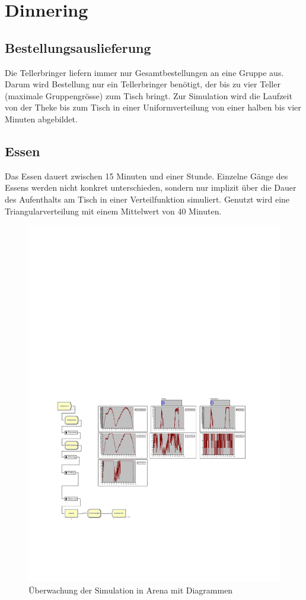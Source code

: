 \documentclass[ngerman,a4paper,12pt]{scrreprt}
\begin{document}
			
	\section{Dinnering}
		\subsection{Bestellungsauslieferung}					
			Die Tellerbringer liefern immer nur Gesamtbestellungen an eine Gruppe aus. Darum wird Bestellung nur ein Tellerbringer benötigt, der bis zu vier Teller (maximale Gruppengrösse) zum Tisch bringt. Zur Simulation wird die Laufzeit von der Theke bis zum Tisch in einer Uniformverteilung von einer halben bis vier Minuten abgebildet.


		\subsection{Essen}
			Das Essen dauert zwischen 15 Minuten und einer Stunde. Einzelne Gänge des Essens werden nicht konkret unterschieden, sondern nur implizit über die Dauer des Aufenthalts am Tisch in einer Verteilfunktion simuliert. Genutzt wird eine Triangularverteilung mit einem Mittelwert von 40 Minuten.\\
			
		\begin{figure}[H]
			\centering
				\includegraphics[trim=5.5cm 7.5cm 2.5cm 15cm, clip=true,width=\textwidth]{img/Model11a.pdf}
				\caption[Diagramme in Arena]{Überwachung der Simulation in Arena mit Diagrammen}
				\label{arenaDiagramme}
		\end{figure}	
			
\end{document}
